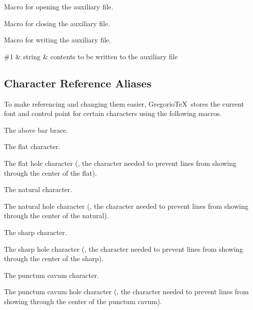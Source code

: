Macro for opening the auxiliary file.

Macro for closing the auxiliary file.

Macro for writing the auxiliary file.

\begin{argtable}
  \#1 & string & contents to be written to the auxiliary file\\
\end{argtable}



\subsection{Character Reference Aliases}
To make referencing and changing them easier, Gregorio\TeX\ stores the current font and control point for certain characters using the following macros.

The above bar brace.

The flat character.

The flat hole character (\ie, the character needed to prevent lines from showing through the center of the flat).

The natural character.

The natural hole character (\ie, the character needed to prevent lines from showing through the center of the natural).

The sharp character.

The sharp hole character (\ie, the character needed to prevent lines from showing through the center of the sharp).

The punctum cavum character.

The punctum cavum hole character (\ie, the character needed to prevent lines from showing through the center of the punctum cavum).

